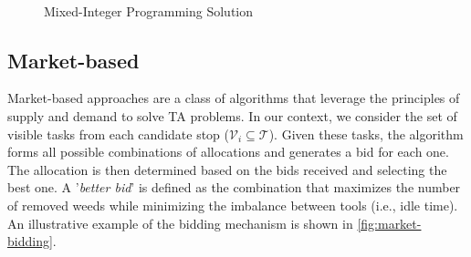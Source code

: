 \begin{figure}[H]
    \myfloatalign
     \quad
     \\
    \caption{Mixed-Integer Programming Solution}\label{fig:mip-solution}
\end{figure}

\subsection{Market-based}
Market-based approaches are a class of algorithms that leverage the principles of supply and demand to solve \ac{TA} problems. In our context, we consider the set of visible tasks from each candidate stop ($\mathcal{V}_i \subseteq \mathcal{T}$). Given these tasks, the algorithm forms all possible combinations of allocations and generates a bid for each one. The allocation is then determined based on the bids received and selecting the best one. A '\textit{better bid}' is defined as the combination that maximizes the number of removed weeds while minimizing the imbalance between tools (i.e., idle time). An illustrative example of the bidding mechanism is shown in \autoref{fig:market-bidding}.

